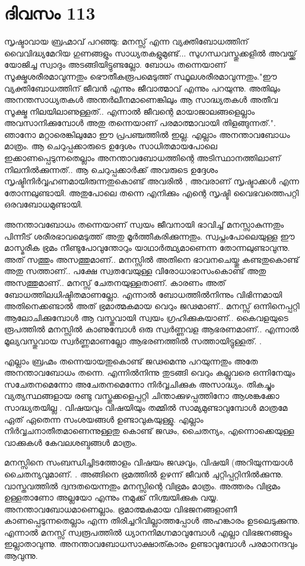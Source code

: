  
\section{ദിവസം 113}


സൃഷ്ടാവായ ബ്രഹ്മാവ്‌ പറഞ്ഞു: മനസ്സ്‌ എന്ന വ്യക്തിബോധത്തിന്‌ വൈവിദ്ധ്യമേറിയ ഗുണങ്ങളും സാധ്യതകളുമുണ്ട്‌... സുഗന്ധവസ്തുക്കളില്‍ അവയ്ക്ക്  യോജിച്ച സ്വാദും അടങ്ങിയിട്ടുണ്ടല്ലോ. ബോധം തന്നെയാണ്‌ സൂക്ഷ്മശരീരമാവുന്നതും ഭൌതീകരൂപമെടുത്ത്‌ സ്ഥൂലശരീരമാവുന്നതും."ഈ വ്യക്തിബോധത്തിന്‌ ജീവന്‍ എന്നും ജീവാത്മാവ്‌ എന്നും പറയുന്നു. അതിലും അനന്തസാധ്യതകള്‍ അന്തര്‍ലീനമാണെങ്കിലും ആ സാദ്ധ്യതകള്‍ അതീവ സൂക്ഷ്മ നിലയിലാണുള്ളത്‌.. എന്നാല്‍ ജീവന്റെ മായാജാലങ്ങളെല്ലാം അവസാനിക്കുമ്പോള്‍ അതു തന്നെയാണ്‌ പരമാത്മാവായി തിളങ്ങുന്നത്‌.". ഞാനോ മറ്റാരെങ്കിലുമോ ഈ പ്രപഞ്ചത്തില്‍ ഇല്ല. എല്ലാം അനന്താവബോധം മാത്രം. ആ ചെറുപ്പക്കാരുടെ ഉദ്ദേശം സാധിതമായപോലെ ഇക്കാണപ്പെടുന്നതെല്ലാം അനന്താവബോധത്തിന്റെ അടിസ്ഥാനത്തിലാണ്‌ നിലനില്‍ക്കുന്നത്‌.. ആ ചെറുപ്പക്കാര്‍ക്ക്‌ അവരുടെ ഉദ്ദേശം സൃഷ്ടിനിര്‍വ്വഹണമായിരുന്നതുകൊണ്ട്‌ അവരില്‍ , അവരാണ്‌ സൃഷ്ടാക്കള്‍ എന്ന തോന്നലുണ്ടായി. അതുപോലെ തന്നെ എനിക്കും എന്റെ സൃഷ്ടി വൈഭവത്തെപറ്റി ഒരവബോധമുണ്ടായി.

അനന്താവബോധം തന്നെയാണ്‌ സ്വയം ജീവനായി ഭാവിച്ച്‌ മനസ്സാകുന്നതും പിന്നീട്‌ ശരീരഭാവമെടുത്ത്‌ അതു മൂര്‍ത്തീകരിക്കുന്നതും. സ്വപ്നംപോലെയുള്ള ഈ മാസ്മരീക ഭ്രമം നീണ്ടുപോവുന്തോറും യാഥാര്‍ത്ഥ്യമാണെന്ന തോന്നലുണ്ടാവുന്നു. അത്‌ സത്തും അസത്തുമാണ്‌.. മനസ്സില്‍ അതിനെ ഭാവനചെയ്തു കണ്ടതുകൊണ്ട്‌ അതു സത്താണ്‌.. പക്ഷേ സ്വതവേയുള്ള വിരോധാഭാസംകൊണ്ട്‌ അതു അസത്തുമാണ്‌.. മനസ്സ്‌ ചേതനയുള്ളതാണ്‌. കാരണം അത്‌ ബോധത്തിലധിഷ്ടിതമാണല്ലോ.  എന്നാല്‍ ബോധത്തില്‍നിന്നും വിഭിന്നമായി അതിനെക്കണ്ടാല്‍ അത്‌ ഭ്രമാത്മകമായ വെറും ജഢമാണ്‌.. മനസ്സ്‌ ഒന്നിനെപ്പറ്റി ആലോചിക്കുമ്പോള്‍ ആ വസ്തുവായി സ്വയം ഗ്രഹിക്കുകയാണ്‌.. കൈവളയുടെ രൂപത്തില്‍ മനസ്സില്‍ കാണുമ്പോള്‍ ഒരു സ്വര്‍ണ്ണവള  ആഭരണമാണ്‌.. എന്നാല്‍ മൂല്യവസ്തുവായ സ്വര്‍ണ്ണമാണല്ലോ ആഭരണത്തില്‍ സത്തായിട്ടുള്ളത്‌. .

എല്ലാം ബ്രഹ്മം തന്നെയായതുകൊണ്ട്‌ ജഢമെന്നു പറയുന്നതും അതേ അനന്താവബോധം തന്നെ. എന്നില്‍നിന്നു തുടങ്ങി വെറും കല്ലുവരെ ഒന്നിനേയും സചേതനമെന്നോ അചേതനമെന്നോ നിര്‍വ്വചിക്കുക അസാദ്ധ്യം. തികച്ചും വ്യത്യസ്ഥങ്ങളായ രണ്ടു വസ്തുക്കളെപ്പറ്റി ചിന്താക്കുഴപ്പത്തിനോ ആശങ്കക്കോ  സാദ്ധ്യതയില്ല . വിഷയവും വിഷയിയും തമ്മില്‍ സാമ്യമുണ്ടാവുമ്പോള്‍ മാത്രമേ ഏത്‌ ഏതെന്ന സംശയങ്ങള്‍ ഉണ്ടാവുകയുള്ളു. എല്ലാം നിര്‍വ്വചനാതീതമാണെന്നുള്ളതു കൊണ്ട്‌ ജഢം, ചൈതന്യം, എന്നൊക്കെയുള്ള വാക്കുകള്‍ കേവലശബ്ദങ്ങള്‍ മാത്രം.

മനസ്സിനെ സംബന്ധിച്ചിടത്തോളം വിഷയം ജഢവും, വിഷയി (അറിയുന്നയാള്‍ ചൈതന്യവുമാണ്‌. . അങ്ങിനെ ഭ്രമത്തില്‍ ഉഴന്ന് ജീവന്‍ ചുറ്റിപ്പറ്റിനില്‍ക്കുന്നു. വാസ്തവത്തില്‍ ദ്വന്ദതയെന്നതും മനസ്സിന്റെ വിഭ്രമം മാത്രം. അത്തരം വിഭ്രമം ഉള്ളതാണോ അല്ലയോ എന്നും നമുക്ക്‌ നിശ്ചയിക്കുക വയ്യ. അനന്താവബോധമാണെല്ലാം. ഭ്രമാത്മകമായ വിഭജനങ്ങളാണീ കാണപ്പെടുന്നതെല്ലാം എന്ന തിരിച്ചറിവില്ലാത്തപ്പോള്‍ അഹങ്കാരം ഉടലെടുക്കുന്നു. എന്നാല്‍ മനസ്സ്‌ സ്വരൂപത്തില്‍ ധ്യാനനിമഗ്നമാവുമ്പോള്‍ എല്ലാ വിഭജനങ്ങളും ഇല്ലാതാവുന്നു. അനന്താവബോധസാക്ഷാത്കാരം  ഉണ്ടാവുമ്പോള്‍ പരമാനന്ദവും ആവുന്നു. 


